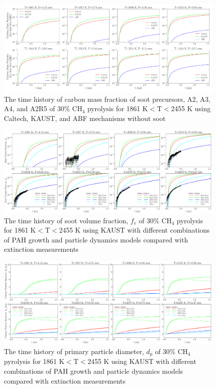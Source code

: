 \begin{figure}[H]
	\centering
	\includegraphics[width=1\textwidth]{Figures/Results/Shocktube/Stanford/june/30CH4_SPC_mechs_nosoot.pdf}
	\caption{The time history of carbon mass fraction of soot precursors, A2, A3, A4, and A2R5 of 30\% $\mathrm{CH_4}$ pyrolysis for 1861 K$<\mathrm{T}<$2455 K using Caltech, KAUST, and ABF mechanisms without soot}
	\label{fig:shocktubest_30ch4_nosoot_spc} 
\end{figure}

\begin{figure}[H]
	\centering
	\includegraphics[width=1\textwidth]{Figures/Results/Shocktube/Stanford/june/30CH4_sootvf_kaust.pdf}
	\caption{The time history of soot volume fraction, $f_v$ of 30\% $\mathrm{CH_4}$ pyrolysis for 1861 K$<\mathrm{T}<$2455 K using KAUST with different combinations of PAH growth and particle dynamics models compared with extinction measurements}
	\label{fig:shocktubest_30ch4_fv_kaust} 
\end{figure}


\begin{figure}[H]
	\centering
	\includegraphics[width=1\textwidth]{Figures/Results/Shocktube/Stanford/june/30CH4_sootdp_kaust.pdf}
	\caption{The time history of primary particle diameter, $d_p$ of 30\% $\mathrm{CH_4}$ pyrolysis for 1861 K$<\mathrm{T}<$2455 K using KAUST with different combinations of PAH growth and particle dynamics models compared with extinction measurements}
	\label{fig:shocktubest_30ch4_dp_kaust} 
\end{figure}


